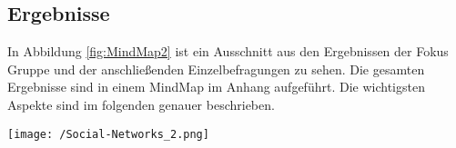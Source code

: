 \documentclass{sigchi}
\begin{document}
\subsection{Ergebnisse}
\label{Ergebnisse}
In Abbildung \ref{fig:MindMap2} ist ein Ausschnitt aus den Ergebnissen der Fokus Gruppe und der anschließenden Einzelbefragungen zu sehen. Die gesamten Ergebnisse sind in einem MindMap im Anhang aufgeführt. Die wichtigsten Aspekte sind im folgenden genauer beschrieben. 
\begin{figure*}[htbp]
	\texttt{[image: /Social-Networks\_2.png]}
	\caption{Ausschnitt aus den Ergebnissen von Fokus Gruppe und Einzelbefragung}
	\label{fig:MindMap2}
\end{figure*}
\end{document}
